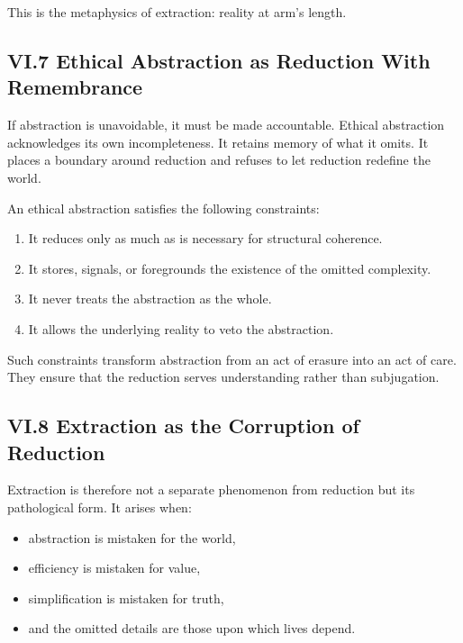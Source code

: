 \documentclass[11pt,letterpaper]{article}
\begin{document}
This is the metaphysics of extraction: reality at arm’s length.

\subsection{VI.7 Ethical Abstraction as Reduction With Remembrance}

If abstraction is unavoidable, it must be made accountable. Ethical abstraction acknowledges its own incompleteness. It retains memory of what it omits. It places a boundary around reduction and refuses to let reduction redefine the world.

An ethical abstraction satisfies the following constraints:

\begin{enumerate}
    \item It reduces only as much as is necessary for structural coherence.
    \item It stores, signals, or foregrounds the existence of the omitted complexity.
    \item It never treats the abstraction as the whole.
    \item It allows the underlying reality to veto the abstraction.
\end{enumerate}

Such constraints transform abstraction from an act of erasure into an act of care. They ensure that the reduction serves understanding rather than subjugation.

\subsection{VI.8 Extraction as the Corruption of Reduction}

Extraction is therefore not a separate phenomenon from reduction but its pathological form. It arises when:

\begin{itemize}
    \item abstraction is mistaken for the world,
    \item efficiency is mistaken for value,
    \item simplification is mistaken for truth,
    \item and the omitted details are those upon which lives depend.
\end{itemize}
\end{document}

